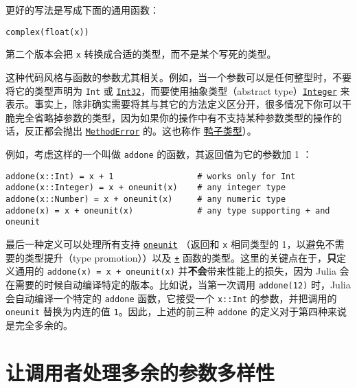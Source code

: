 更好的写法是写成下面的通用函数：




\begin{verbatim}
complex(float(x))
\end{verbatim}



第二个版本会把 \texttt{x} 转换成合适的类型，而不是某个写死的类型。



这种代码风格与函数的参数尤其相关。例如，当一个参数可以是任何整型时，不要将它的类型声明为 \texttt{Int} 或 \hyperlink{10103694114785108551}{\texttt{Int32}}，而要使用抽象类型（abstract type）\hyperlink{8469131683393450448}{\texttt{Integer}} 来表示。事实上，除非确实需要将其与其它的方法定义区分开，很多情况下你可以干脆完全省略掉参数的类型，因为如果你的操作中有不支持某种参数类型的操作的话，反正都会抛出 \hyperlink{68769522931907606}{\texttt{MethodError}} 的。这也称作 \href{https://zh.wikipedia.org/wiki/\%E9\%B8\%AD\%E5\%AD\%90\%E7\%B1\%BB\%E5\%9E\%8B}{鸭子类型}）。



例如，考虑这样的一个叫做 \texttt{addone} 的函数，其返回值为它的参数加 1 ：




\begin{verbatim}
addone(x::Int) = x + 1                 # works only for Int
addone(x::Integer) = x + oneunit(x)    # any integer type
addone(x::Number) = x + oneunit(x)     # any numeric type
addone(x) = x + oneunit(x)             # any type supporting + and oneunit
\end{verbatim}



最后一种定义可以处理所有支持 \hyperlink{2310843180104103470}{\texttt{oneunit}} （返回和 \texttt{x} 相同类型的 1，以避免不需要的类型提升（type promotion））以及 \hyperlink{3677358729494553841}{\texttt{+}} 函数的类型。这里的关键点在于，\textbf{只}定义通用的 \texttt{addone(x) = x + oneunit(x)} 并\textbf{不会}带来性能上的损失，因为 Julia 会在需要的时候自动编译特定的版本。比如说，当第一次调用 \texttt{addone(12)} 时，Julia 会自动编译一个特定的 \texttt{addone} 函数，它接受一个 \texttt{x::Int} 的参数，并把调用的 \texttt{oneunit} 替换为内连的值 \texttt{1}。因此，上述的前三种 \texttt{addone} 的定义对于第四种来说是完全多余的。



\hypertarget{14005859971102001375}{}


\section{让调用者处理多余的参数多样性}



